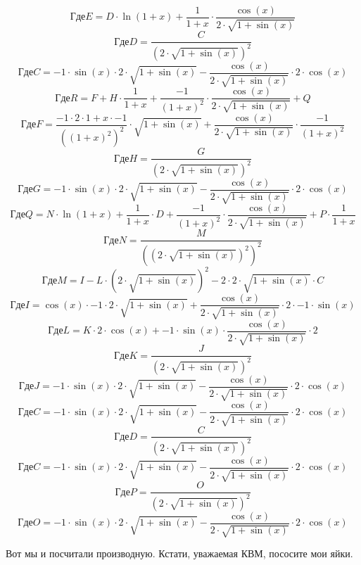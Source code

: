 \documentclass[12pt, a4paper]{article}
\begin{document}
$$Где E = D \cdot \ln(1+x)+\frac{1}{1+x} \cdot \frac{\cos(x)}{2 \cdot \sqrt{1+\sin(x)}}$$
$$Где D = \frac{C}{{(2 \cdot \sqrt{1+\sin(x)})}^{2}}$$
$$Где C = -1 \cdot \sin(x) \cdot 2 \cdot \sqrt{1+\sin(x)}-\frac{\cos(x)}{2 \cdot \sqrt{1+\sin(x)}} \cdot 2 \cdot \cos(x)$$
$$Где R = F+H \cdot \frac{1}{1+x}+\frac{-1}{{(1+x)}^{2}} \cdot \frac{\cos(x)}{2 \cdot \sqrt{1+\sin(x)}}+Q$$
$$Где F = \frac{-1 \cdot 2 \cdot 1+x \cdot -1}{{({(1+x)}^{2})}^{2}} \cdot \sqrt{1+\sin(x)}+\frac{\cos(x)}{2 \cdot \sqrt{1+\sin(x)}} \cdot \frac{-1}{{(1+x)}^{2}}$$
$$Где H = \frac{G}{{(2 \cdot \sqrt{1+\sin(x)})}^{2}}$$
$$Где G = -1 \cdot \sin(x) \cdot 2 \cdot \sqrt{1+\sin(x)}-\frac{\cos(x)}{2 \cdot \sqrt{1+\sin(x)}} \cdot 2 \cdot \cos(x)$$
$$Где Q = N \cdot \ln(1+x)+\frac{1}{1+x} \cdot D+\frac{-1}{{(1+x)}^{2}} \cdot \frac{\cos(x)}{2 \cdot \sqrt{1+\sin(x)}}+P \cdot \frac{1}{1+x}$$
$$Где N = \frac{M}{{({(2 \cdot \sqrt{1+\sin(x)})}^{2})}^{2}}$$
$$Где M = I-L \cdot {(2 \cdot \sqrt{1+\sin(x)})}^{2}-2 \cdot 2 \cdot \sqrt{1+\sin(x)} \cdot C$$
$$Где I = \cos(x) \cdot -1 \cdot 2 \cdot \sqrt{1+\sin(x)}+\frac{\cos(x)}{2 \cdot \sqrt{1+\sin(x)}} \cdot 2 \cdot -1 \cdot \sin(x)$$
$$Где L = K \cdot 2 \cdot \cos(x)+-1 \cdot \sin(x) \cdot \frac{\cos(x)}{2 \cdot \sqrt{1+\sin(x)}} \cdot 2$$
$$Где K = \frac{J}{{(2 \cdot \sqrt{1+\sin(x)})}^{2}}$$
$$Где J = -1 \cdot \sin(x) \cdot 2 \cdot \sqrt{1+\sin(x)}-\frac{\cos(x)}{2 \cdot \sqrt{1+\sin(x)}} \cdot 2 \cdot \cos(x)$$
$$Где C = -1 \cdot \sin(x) \cdot 2 \cdot \sqrt{1+\sin(x)}-\frac{\cos(x)}{2 \cdot \sqrt{1+\sin(x)}} \cdot 2 \cdot \cos(x)$$
$$Где D = \frac{C}{{(2 \cdot \sqrt{1+\sin(x)})}^{2}}$$
$$Где C = -1 \cdot \sin(x) \cdot 2 \cdot \sqrt{1+\sin(x)}-\frac{\cos(x)}{2 \cdot \sqrt{1+\sin(x)}} \cdot 2 \cdot \cos(x)$$
$$Где P = \frac{O}{{(2 \cdot \sqrt{1+\sin(x)})}^{2}}$$
$$Где O = -1 \cdot \sin(x) \cdot 2 \cdot \sqrt{1+\sin(x)}-\frac{\cos(x)}{2 \cdot \sqrt{1+\sin(x)}} \cdot 2 \cdot \cos(x)$$


Вот мы и посчитали производную. Кстати, уважаемая КВМ, пососите мои яйки.
\end{document}

